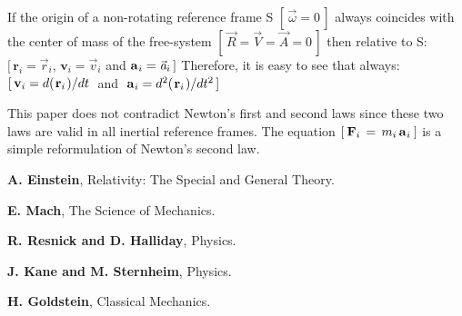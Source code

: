 \documentclass[10pt]{article}
\begin{document}
\par \bigskip\smallskip \noindent If the origin of a non-rotating reference frame S $[ \, {\vec{\omega}} = 0 \, ]$ always coincides with the center of mass of the free-system $[ \, {\vec{\mathit{R}}} = {\vec{\mathit{V}}} = {\vec{\mathit{A}}} = 0 \, ]$ then relative to S: $[ \, {\mathbf{r}}_i = {\vec{\mathit{r}}}_i$, ${\mathbf{v}}_i = {\vec{\mathit{v}}}_i$ and ${\mathbf{a}}_{\hspace{+0.045em}i} = {\vec{\mathit{a}}}_i \, ]$ Therefore, it is easy to see that always: $[ \, {\mathbf{v}}_i = d(\hspace{+0.090em}{\mathbf{r}}_i\hspace{+0.090em})/dt$ $\;$and$\;$ ${\mathbf{a}}_{\hspace{+0.045em}i} = d^2(\hspace{+0.090em}{\mathbf{r}}_i\hspace{+0.090em})/dt^2 \, ]$

\par \bigskip\smallskip \noindent This paper does not contradict Newton's first and second laws since these two laws are valid in all inertial reference frames. The equation $[ \: {\mathbf{F}}_i \,=\, m_i \, {\mathbf{a}}_{\hspace{+0.045em}i} \: ]$ is a simple reformulation of Newton's second law.

\vspace{-1.050em}

\par {}

\par \bigskip\smallskip \noindent \textbf{A. Einstein}, Relativity: The Special and General Theory.

\par \bigskip\smallskip \noindent \textbf{E. Mach}, The Science of Mechanics.

\par \bigskip\smallskip \noindent \textbf{R. Resnick and D. Halliday}, Physics.

\par \bigskip\smallskip \noindent \textbf{J. Kane and M. Sternheim}, Physics.

\par \bigskip\smallskip \noindent \textbf{H. Goldstein}, Classical Mechanics.
\end{document}
